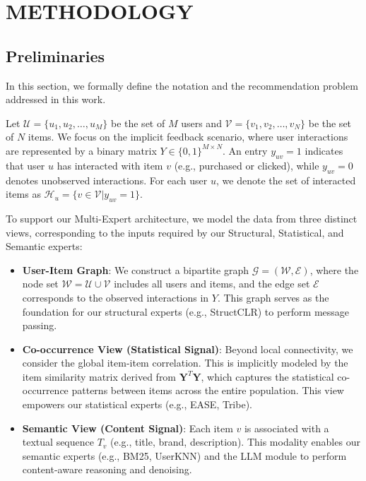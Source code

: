 \section{METHODOLOGY}
\label{sec:methodology}

\subsection{Preliminaries}
\label{subsec:preliminaries}

In this section, we formally define the notation and the recommendation problem addressed in this work.

Let $\mathcal{U} = \{ u_{1},u_{2},\ldots,u_{M}\}$ be the set of $M$ users and $\mathcal{V} = \{ v_{1},v_{2},\ldots,v_{N}\}$ be the set of $N$ items. We focus on the implicit feedback scenario, where user interactions are represented by a binary matrix $Y \in \{ 0,1\}^{M \times N}$. An entry $y_{uv} = 1$ indicates that user $u$ has interacted with item $v$ (e.g., purchased or clicked), while $y_{uv} = 0$ denotes unobserved interactions. For each user $u$, we denote the set of interacted items as $\mathcal{H}_{u} = \{ v \in \mathcal{V}|y_{uv} = 1\}$.

To support our Multi-Expert architecture, we model the data from three distinct views, corresponding to the inputs required by our Structural, Statistical, and Semantic experts:

\begin{itemize}
    \item \textbf{User-Item Graph}: We construct a bipartite graph $\mathcal{G} = \left( \mathcal{W},\mathcal{E} \right)$, where the node set $\mathcal{W} = \mathcal{U} \cup \mathcal{V}$ includes all users and items, and the edge set $\mathcal{E}$ corresponds to the observed interactions in $Y$. This graph serves as the foundation for our structural experts (e.g., StructCLR) to perform message passing.
    
    \item \textbf{Co-occurrence View (Statistical Signal)}: Beyond local connectivity, we consider the global item-item correlation. This is implicitly modeled by the item similarity matrix derived from $\mathbf{Y}^{T}\mathbf{Y}$, which captures the statistical co-occurrence patterns between items across the entire population. This view empowers our statistical experts (e.g., EASE, Tribe).
    
    \item \textbf{Semantic View (Content Signal)}: Each item $v$ is associated with a textual sequence $T_{v}$ (e.g., title, brand, description). This modality enables our semantic experts (e.g., BM25, UserKNN) and the LLM module to perform content-aware reasoning and denoising.
\end{itemize}

